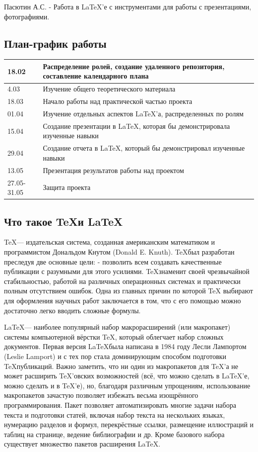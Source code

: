 \documentclass{article}
\begin{document}
\vspace{\baselineskip}
Пасютин А.С. - Работа в LaTeX’е с инструментами для работы с презентациями, фотографиями.

\subsection*{План-график работы}
\begin{tabular}{|l|p{12cm}|}
	\hline
	18.02 & Распределение ролей, создание удаленного репозитория, составление календарного плана \\
	\hline
	4.03 & Изучение общего теоретического материала \\
	\hline
	18.03 & Начало работы над практической частью проекта \\
	\hline
	01.04 & Изучение отдельных аспектов \LaTeX’а, распределенных по ролям \\
	\hline
	15.04 & Создание презентации в \LaTeX, которая бы демонстрировала изученные навыки \\
	\hline
	29.04 & Создание отчета в \LaTeX, который бы демонстрировал изученные навыки
	\\
	\hline
	13.05 & Презентация результатов работы над проектом \\
	\hline
	27.05-31.05 & Защита проекта \\
	\hline
\end{tabular}

\subsection*{Что такое \TeX и \LaTeX}
\TeX — издательская система, созданная американским математиком и программистом Дональдом Кнутом (Donald E. Knuth). \TeX был разработан преследуя две основные цели: - позволить всем создавать качественные публикации с разумными для этого усилиями. \TeX знаменит своей чрезвычайной стабильностью, работой на различных операционных системах и практически полным отсутствием ошибок. Одна из главных причин по которой TeX выбирают для оформления научных работ заключается в том, что с его помощью можно достаточно легко вводить сложные формулы.

\vspace{\baselineskip}
\LaTeX — наиболее популярный набор макрорасширений (или макропакет) системы компьютерной вёрстки TeX, который облегчает набор сложных документов. Первая версия \LaTeX была написана в 1984 году Лесли Лампортом (Leslie Lamport) и с тех пор стала доминирующим способом подготовки \TeX публикаций. Важно заметить, что ни один из макропакетов для \TeX’а не может расширить \TeX’овских возможностей (всё, что можно сделать в LaTeX’е, можно сделать и в \TeX’е), но, благодаря различным упрощениям, использование макропакетов зачастую позволяет избежать весьма изощрённого программирования. Пакет позволяет автоматизировать многие задачи набора текста и подготовки статей, включая набор текста на нескольких языках, нумерацию разделов и формул, перекрёстные ссылки, размещение иллюстраций и таблиц на странице, ведение библиографии и др. Кроме базового набора существует множество пакетов расширения \LaTeX.
\end{document}
